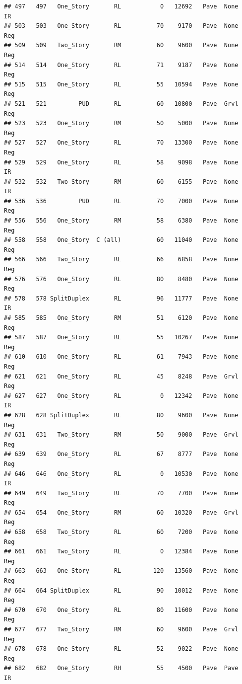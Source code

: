 \documentclass[]{article}
\begin{document}
\begin{verbatim}
## 497   497   One_Story       RL           0   12692   Pave  None       IR
## 503   503   One_Story       RL          70    9170   Pave  None      Reg
## 509   509   Two_Story       RM          60    9600   Pave  None      Reg
## 514   514   One_Story       RL          71    9187   Pave  None      Reg
## 515   515   One_Story       RL          55   10594   Pave  None      Reg
## 521   521         PUD       RL          60   10800   Pave  Grvl      Reg
## 523   523   One_Story       RM          50    5000   Pave  None      Reg
## 527   527   One_Story       RL          70   13300   Pave  None      Reg
## 529   529   One_Story       RL          58    9098   Pave  None       IR
## 532   532   Two_Story       RM          60    6155   Pave  None       IR
## 536   536         PUD       RL          70    7000   Pave  None      Reg
## 556   556   One_Story       RM          58    6380   Pave  None      Reg
## 558   558   One_Story  C (all)          60   11040   Pave  None      Reg
## 566   566   Two_Story       RL          66    6858   Pave  None      Reg
## 576   576   One_Story       RL          80    8480   Pave  None      Reg
## 578   578 SplitDuplex       RL          96   11777   Pave  None       IR
## 585   585   One_Story       RM          51    6120   Pave  None      Reg
## 587   587   One_Story       RL          55   10267   Pave  None      Reg
## 610   610   One_Story       RL          61    7943   Pave  None      Reg
## 621   621   One_Story       RL          45    8248   Pave  Grvl      Reg
## 627   627   One_Story       RL           0   12342   Pave  None       IR
## 628   628 SplitDuplex       RL          80    9600   Pave  None      Reg
## 631   631   Two_Story       RM          50    9000   Pave  Grvl      Reg
## 639   639   One_Story       RL          67    8777   Pave  None      Reg
## 646   646   One_Story       RL           0   10530   Pave  None       IR
## 649   649   Two_Story       RL          70    7700   Pave  None      Reg
## 654   654   One_Story       RM          60   10320   Pave  Grvl      Reg
## 658   658   Two_Story       RL          60    7200   Pave  None      Reg
## 661   661   Two_Story       RL           0   12384   Pave  None      Reg
## 663   663   One_Story       RL         120   13560   Pave  None      Reg
## 664   664 SplitDuplex       RL          90   10012   Pave  None      Reg
## 670   670   One_Story       RL          80   11600   Pave  None      Reg
## 677   677   Two_Story       RM          60    9600   Pave  Grvl      Reg
## 678   678   One_Story       RL          52    9022   Pave  None      Reg
## 682   682   One_Story       RH          55    4500   Pave  Pave       IR

\end{verbatim}
\end{document}

